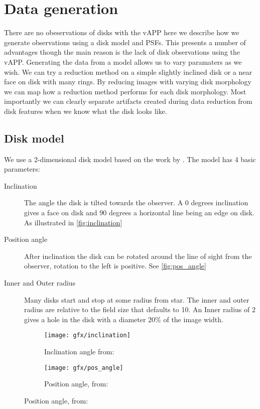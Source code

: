 
\chapter{Data generation} %
\label{ch:data_gen} %

There are no obeservations of disks with the \ac{vAPP} here we describe how we generate observations using a disk model and \acp{PSF}. This presents a number of advantages though the main reason is the lack of disk observations using the \ac{vAPP}. Generating the data from a model allows us to vary paramaters as we wish. We can try a reduction method on a simple slightly inclined disk or a near face on disk with many rings. By reducing images with varying disk morphology we can map how a reduction method performs for each disk morphology. Most importantly we can clearly separate artifacts created during data reduction from disk features when we know what the disk looks like.





\section{Disk model}

We use a 2-dimensional disk model based on the work by \cite{Pieter_Okko}. The model has 4 basic parameters: 

\begin{description}
\item[Inclination] The angle the disk is tilted towards the observer. A 0 degrees inclination gives a face on disk and 90 degrees a horizontal line being an edge on disk. As illustrated in \autoref{fig:inclination}
\item[Position angle] After inclination the disk can be rotated around the line of sight from the observer, rotation to the left is positive. See \autoref{fig:pos_angle}
\item[Inner and Outer radius] Many disks start and stop at some radius from star. The inner and outer radius are relative to the field size that defaults to 10. An Inner radius of 2 gives a hole in the disk with a diameter 20\% of the image width. 
\end{description}

\begin{figure}[h!]
  \centering
  \begin{subfigure}[b]{0.4\textwidth}
    \texttt{[image: gfx/inclination]}
    \caption{Inclination angle from: \cite{Pieter_Okko}}
    \label{fig:pos_angle}

  \end{subfigure}
  \begin{subfigure}[b]{0.4\textwidth}
    \texttt{[image: gfx/pos\_angle]}
    \caption{Position angle, from: \cite{Pieter_Okko}}
    \label{fig:inclination}
  \end{subfigure}
  \label{fig:1}
\end{figure}

